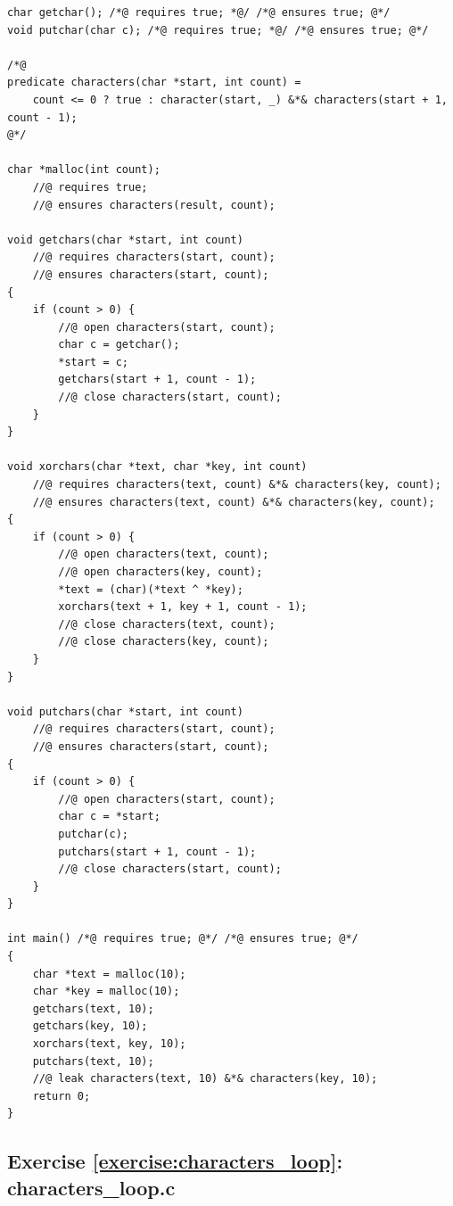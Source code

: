 \documentclass{article}
\begin{document}
\begin{lstlisting}
char getchar(); /*@ requires true; *@/ /*@ ensures true; @*/
void putchar(char c); /*@ requires true; *@/ /*@ ensures true; @*/

/*@
predicate characters(char *start, int count) =
    count <= 0 ? true : character(start, _) &*& characters(start + 1, count - 1);
@*/

char *malloc(int count);
    //@ requires true;
    //@ ensures characters(result, count);

void getchars(char *start, int count)
    //@ requires characters(start, count);
    //@ ensures characters(start, count);
{
    if (count > 0) {
        //@ open characters(start, count);
        char c = getchar();
        *start = c;
        getchars(start + 1, count - 1);
        //@ close characters(start, count);
    }
}

void xorchars(char *text, char *key, int count)
    //@ requires characters(text, count) &*& characters(key, count);
    //@ ensures characters(text, count) &*& characters(key, count);
{
    if (count > 0) {
        //@ open characters(text, count);
        //@ open characters(key, count);
        *text = (char)(*text ^ *key);
        xorchars(text + 1, key + 1, count - 1);
        //@ close characters(text, count);
        //@ close characters(key, count);
    }
}

void putchars(char *start, int count)
    //@ requires characters(start, count);
    //@ ensures characters(start, count);
{
    if (count > 0) {
        //@ open characters(start, count);
        char c = *start;
        putchar(c);
        putchars(start + 1, count - 1);
        //@ close characters(start, count);
    }
}

int main() /*@ requires true; @*/ /*@ ensures true; @*/
{
    char *text = malloc(10);
    char *key = malloc(10);
    getchars(text, 10);
    getchars(key, 10);
    xorchars(text, key, 10);
    putchars(text, 10);
    //@ leak characters(text, 10) &*& characters(key, 10);
    return 0;
}
\end{lstlisting}

\subsection{Exercise \ref{exercise:characters_loop}: characters\_loop.c}\label{solution:characters_loop}
\end{document}
